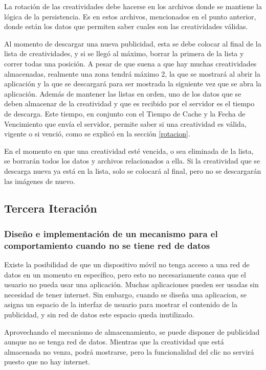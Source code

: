 La rotación de las creatividades debe hacerse en los archivos donde
se mantiene la lógica de la persistencia. Es en estos archivos, mencionados
en el punto anterior, donde están los datos que permiten saber cuales
son las creatividades válidas. 

Al momento de descargar una nueva publicidad, esta se debe colocar
al final de la lista de creatividades, y si se llegó al máximo, borrar
la primera de la lista y correr todas una posición. A pesar de que
suena a que hay muchas creatividades almacenadas, realmente una zona
tendrá máximo 2, la que se mostrará al abrir la aplicación y la que
se descargará para ser mostrada la siguiente vez que se abra la aplicación.
Además de mantener las listas en orden, uno de los datos que se deben
almacenar de la creatividad y que es recibido por el servidor es el
tiempo de descarga. Este tiempo, en conjunto con el Tiempo de Cache
y la Fecha de Vencimiento que envía el servidor, permite saber si
una creatividad es válida, vigente o si venció, como se explicó en
la sección \ref{rotacion}.

En el momento en que una creatividad esté vencida, o sea eliminada
de la lista, se borrarán todos los datos y archivos relacionados a
ella. Si la creatividad que se descarga nueva ya está en la lista,
solo se colocará al final, pero no se descargarán las imágenes de
nuevo.


\subsection{Tercera Iteración}


\subsubsection{Diseño e implementación de un mecanismo para el comportamiento cuando
no se tiene red de datos}

Existe la posibilidad de que un dispositivo móvil no tenga acceso
a una red de datos en un momento en específico, pero esto no necesariamente
causa que el usuario no pueda usar una aplicación. Muchas aplicaciones
pueden ser usadas sin necesidad de tener internet. Sin embargo, cuando
se diseña una aplicacion, se asigna un espacio de la interfaz de usuario
para mostrar el contenido de la publicidad, y sin red de datos este
espacio queda inutilizado. 

Aprovechando el mecanismo de almacenamiento, se puede disponer de
publicidad aunque no se tenga red de datos. Mientras que la creatividad
que está almacenada no venza, podrá mostrarse, pero la funcionalidad
del clic no servirá puesto que no hay internet.

